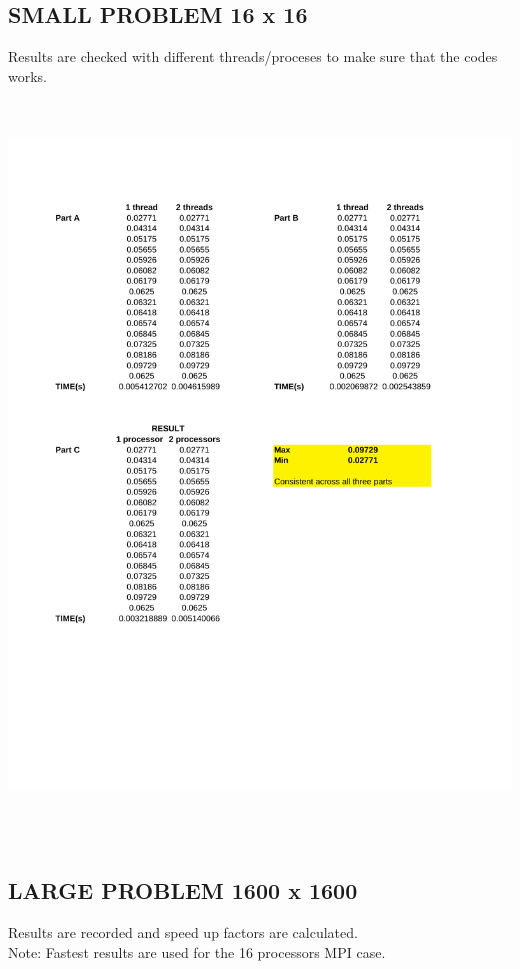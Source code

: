 \documentclass[12pt]{article}
\begin{document}
    \subsection{SMALL PROBLEM 16 x 16 }
    \noindent
    Results are checked with different threads/proceses to make sure that the codes works.
   \hfill\includegraphics[width = 160mm, height = 200mm]{resultsSMALL.pdf}\hspace*{\fill}
   \newpage
   \subsection{LARGE PROBLEM 1600 x 1600}
   \noindent
   Results are recorded and speed up factors are calculated. \\
   Note: Fastest results are used for the 16 processors MPI case. 
\end{document}
